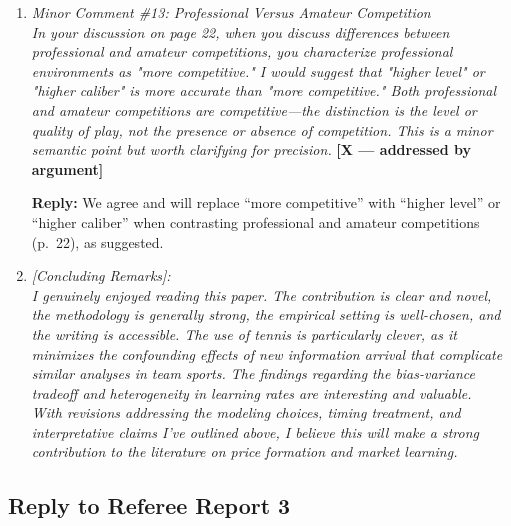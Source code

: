 \documentclass[letterpaper,12pt]{article}
\newcounter{b}
\newcommand{\argX}{\textcolor{green!55!black}{\textbf{[X --- addressed by argument]}}}
\newcommand{\Reply}[1]{\par\noindent\textbf{Reply:} #1}
\begin{document}
\begin{enumerate}
\item \textit{Minor Comment \#13: Professional Versus Amateur Competition\\[6pt]
In your discussion on page 22, when you discuss differences between professional and amateur competitions, you characterize professional environments as "more competitive." I would suggest that "higher level" or "higher caliber" is more accurate than "more competitive." Both professional and amateur competitions are competitive—the distinction is the level or quality of play, not the presence or absence of competition. This is a minor semantic point but worth clarifying for precision.} \argX

\Reply{We agree and will replace ``more competitive'' with ``higher level'' or ``higher caliber'' when contrasting professional and amateur competitions (p.~22), as suggested.}

\item \textit{[Concluding Remarks]:\\[6pt]
I genuinely enjoyed reading this paper. The contribution is clear and novel, the methodology is generally strong, the empirical setting is well-chosen, and the writing is accessible. The use of tennis is particularly clever, as it minimizes the confounding effects of new information arrival that complicate similar analyses in team sports. The findings regarding the bias-variance tradeoff and heterogeneity in learning rates are interesting and valuable.\\[6pt]
With revisions addressing the modeling choices, timing treatment, and interpretative claims I've outlined above, I believe this will make a strong contribution to the literature on price formation and market learning.}

\end{enumerate}
\newpage
\subsection*{Reply to Referee Report 3}
\end{document}
